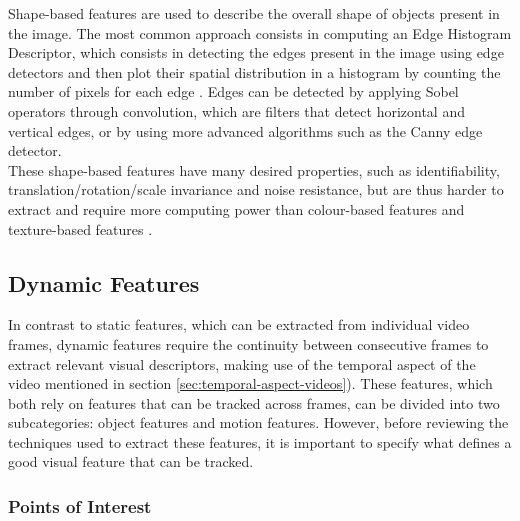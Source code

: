 Shape-based features are used to describe the overall shape of objects present in the image. The most common approach consists in computing an Edge Histogram Descriptor, which consists in detecting the edges present in the image using edge detectors and then plot their spatial distribution in a histogram by counting the number of pixels for each edge \cite{hauptmann2004informedia}. Edges can be detected by applying Sobel operators through convolution, which are filters that detect horizontal and vertical edges, or by using more advanced algorithms such as the Canny edge detector.\\ 

These shape-based features have many desired properties, such as identifiability, translation/rotation/scale invariance and noise resistance, but are thus harder to extract and require more computing power than colour-based features and texture-based features \cite{park2011shapefeatures}.


\subsection{Dynamic Features}
\label{sec:dynamic-features}

In contrast to static features, which can be extracted from individual video frames, dynamic features require the continuity between consecutive frames to extract relevant visual descriptors, making use of the temporal aspect of the video mentioned in section \ref{sec:temporal-aspect-videos}). These features, which both rely on features that can be tracked across frames, can be divided into two subcategories: object features and motion features. However, before reviewing the techniques used to extract these features, it is important to specify what defines a good visual feature that can be tracked.

\subsubsection{Points of Interest}

